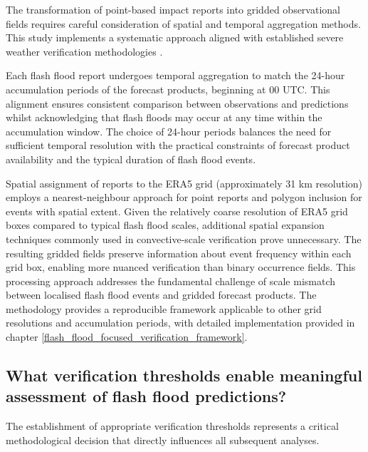 The transformation of point-based impact reports into gridded observational fields requires careful consideration of spatial and temporal aggregation methods. This study implements a systematic approach aligned with established severe weather verification methodologies \citep{Tsonevsky_2018, Pillosu_2024}.

Each flash flood report undergoes temporal aggregation to match the 24-hour accumulation periods of the forecast products, beginning at 00 UTC. This alignment ensures consistent comparison between observations and predictions whilst acknowledging that flash floods may occur at any time within the accumulation window. The choice of 24-hour periods balances the need for sufficient temporal resolution with the practical constraints of forecast product availability and the typical duration of flash flood events.

Spatial assignment of reports to the ERA5 grid (approximately 31 km resolution) employs a nearest-neighbour approach for point reports and polygon inclusion for events with spatial extent. Given the relatively coarse resolution of ERA5 grid boxes compared to typical flash flood scales, additional spatial expansion techniques commonly used in convective-scale verification prove unnecessary. The resulting gridded fields preserve information about event frequency within each grid box, enabling more nuanced verification than binary occurrence fields.
This processing approach addresses the fundamental challenge of scale mismatch between localised flash flood events and gridded forecast products. The methodology provides a reproducible framework applicable to other grid resolutions and accumulation periods, with detailed implementation provided in chapter \ref{flash_flood_focused_verification_framework}.


\subsection{What verification thresholds enable meaningful assessment of flash flood predictions?}

The establishment of appropriate verification thresholds represents a critical methodological decision that directly influences all subsequent analyses. 

